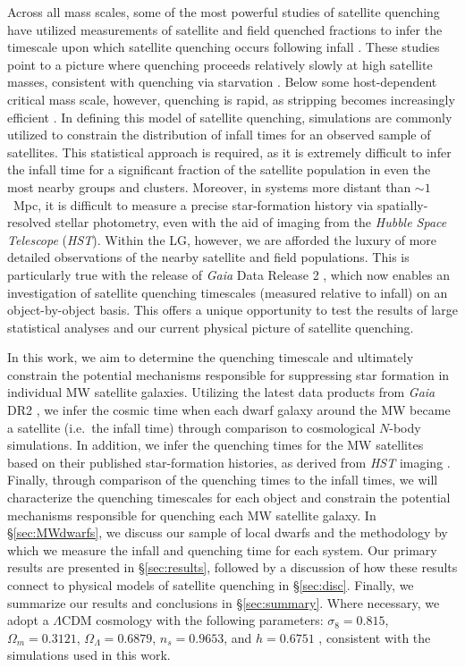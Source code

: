 Across all mass scales, some of the most powerful studies of satellite quenching
have utilized measurements of satellite and field quenched fractions to infer
the timescale upon which satellite quenching occurs following infall
\citep[e.g.][]{wetzel13, fham15, balogh16, fossati17}.
%
These studies point to a picture where quenching proceeds relatively slowly at
high satellite masses, consistent with quenching via starvation
\citep{fham15}. Below some host-dependent critical mass scale, however,
quenching is rapid, as stripping becomes increasingly efficient \citep{fham16}.
%
In defining this model of satellite quenching, simulations are commonly utilized
to constrain the distribution of infall times for an observed sample of
satellites. This statistical approach is required, as it is extremely difficult
to infer the infall time for a significant fraction of the satellite population
in even the most nearby groups and clusters.
%
Moreover, in systems more distant than $\sim1$~Mpc, it is difficult to measure a
precise star-formation history via spatially-resolved stellar photometry, even
with the aid of imaging from the {\it Hubble Space Telescope} ({\it HST}).
%
Within the LG, however, we are afforded the luxury of more detailed observations
of the nearby satellite and field populations. This is particularly true with
the release of {\it Gaia} Data Release 2 \citep[DR2,][]{gaia, gaiaDR2}, which
now enables an investigation of satellite quenching timescales (measured
relative to infall) on an object-by-object basis.
%
This offers a unique opportunity to test the results of large statistical
analyses and our current physical picture of satellite quenching. 


In this work, we aim to determine the quenching timescale and ultimately
constrain the potential mechanisms responsible for suppressing star formation in
individual MW satellite galaxies.
%
Utilizing the latest data products from {\it Gaia} DR2 \citep{gaiaDR2,
  gaiaDR2PM}, we infer the cosmic time when each dwarf galaxy around the MW
became a satellite (i.e.~the infall time) through comparison to cosmological
$N$-body simulations.
%
In addition, we infer the quenching times for the MW satellites based on their
published star-formation histories, as derived from {\it HST} imaging
\citep{weisz14a, weisz15, brown14}. Finally, through comparison of the quenching
times to the infall times, we will characterize the quenching timescales for
each object and constrain the potential mechanisms responsible for quenching
each MW satellite galaxy.
%
In \S\ref{sec:MWdwarfs}, we discuss our sample of local dwarfs and the
methodology by which we measure the infall and quenching time for each system.
%
Our primary results are presented in \S\ref{sec:results}, followed by a
discussion of how these results connect to physical models of satellite
quenching in \S\ref{sec:disc}. Finally, we summarize our results and
conclusions in \S\ref{sec:summary}.
%
Where necessary, we adopt a $\Lambda$CDM cosmology with the following
parameters: $\sigma_8 = 0.815$, $\Omega_{m} =
0.3121$, $\Omega_{\Lambda} = 0.6879$, $n_{s} = 0.9653$, and $h =
0.6751$ \citep{planck16}, consistent with the simulations used in this
work.









